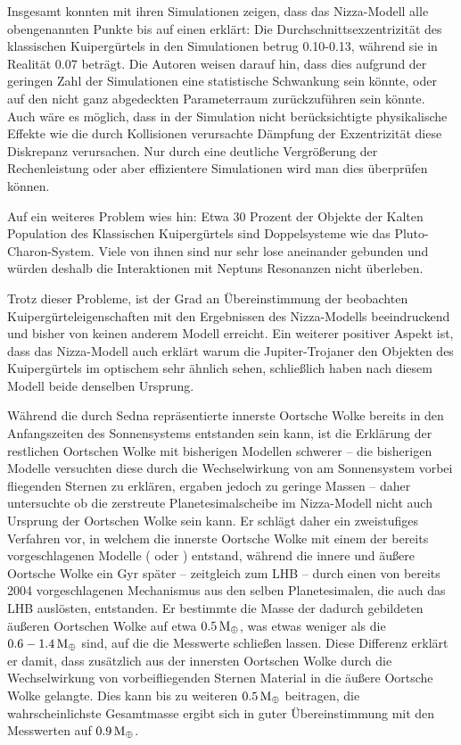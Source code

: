 \documentclass[12pt,a4paper,twoside]{article}
\renewcommand{\cite}{\citep}
\newcommand{\ME}{M_\oplus}
\begin{document}
Insgesamt konnten \cite{Levison2008}mit ihren Simulationen zeigen, dass das Nizza-Modell alle obengenannten Punkte bis auf einen erklärt: Die Durchschnittsexzentrizität des klassischen Kuipergürtels in den Simulationen betrug 0.10-0.13, während sie in Realität 0.07 beträgt.
Die Autoren weisen darauf hin, dass dies aufgrund der geringen Zahl der Simulationen eine statistische Schwankung sein könnte, oder auf den nicht ganz abgedeckten Parameterraum zurückzuführen sein könnte. Auch wäre es möglich, dass in der Simulation nicht berücksichtigte physikalische Effekte wie die durch Kollisionen verursachte Dämpfung der Exzentrizität diese Diskrepanz verursachen\cite{Levison2008}.
Nur durch eine deutliche Vergrößerung der Rechenleistung oder aber effizientere Simulationen wird man dies überprüfen können.

Auf ein weiteres Problem wies \cite{Parker2010} hin:
Etwa 30 Prozent der Objekte der Kalten Population des Klassischen Kuipergürtels sind Doppelsysteme wie das Pluto-Charon-System.
Viele von ihnen sind nur sehr lose aneinander gebunden und würden deshalb die Interaktionen mit Neptuns Resonanzen nicht überleben.

Trotz dieser Probleme, ist der Grad an Übereinstimmung der beobachten Kuiper\-gürtel\-eigen\-schaften mit den Ergebnissen des Nizza-Modells beeindruckend und bisher von keinen anderem Modell erreicht.
Ein weiterer positiver Aspekt ist, dass das Nizza-Modell auch erklärt warum die Jupiter-Trojaner den Objekten des Kuipergürtels im optischem sehr ähnlich sehen, schließlich haben nach diesem Modell beide denselben Ursprung\cite{Morbidelli2005}.

Während die durch Sedna repräsentierte innerste Oortsche Wolke bereits in den Anfangszeiten des Sonnensystems entstanden sein kann, ist die Erklärung der restlichen Oortschen Wolke mit bisherigen Modellen schwerer – die bisherigen Modelle versuchten diese durch die Wechselwirkung von am Sonnensystem vorbei fliegenden Sternen zu erklären, ergaben jedoch zu geringe Massen – daher untersuchte \cite{Brasser2008} ob die zerstreute Planetesimalscheibe im Nizza-Modell nicht auch Ursprung der Oortschen Wolke sein kann.
Er schlägt daher ein zweistufiges Verfahren vor, in welchem die innerste Oortsche Wolke mit einem der bereits vorgeschlagenen Modelle (\cite{Brasser2006,Brasser2007} oder \cite{Kaib2008}) entstand, während die innere und äußere Oortsche Wolke ein Gyr später – zeitgleich zum LHB – durch einen von \cite{Dones2004} bereits 2004 vorgeschlagenen Mechanismus aus den selben Planetesimalen, die auch das LHB auslösten, entstanden\cite{Brasser2008}.
Er bestimmte die Masse der dadurch gebildeten äußeren Oortschen Wolke auf etwa $\unit[0.5]{\ME}$, was etwas weniger als die $\unit[0.6-1.4]{\ME}$ sind, auf die die Messwerte schließen lassen\cite{Brasser2008}. Diese Differenz erklärt er damit, dass zusätzlich aus der innersten Oortschen Wolke durch die Wechselwirkung von vorbeifliegenden Sternen Material in die äußere Oortsche Wolke gelangte\cite{Brasser2008}.
Dies kann bis zu weiteren $\unit[0.5]{\ME}$ beitragen, die wahrscheinlichste Gesamtmasse ergibt sich in guter Übereinstimmung mit den Messwerten auf $\unit[0.9]{\ME}$\cite{Brasser2008}.
\end{document}
